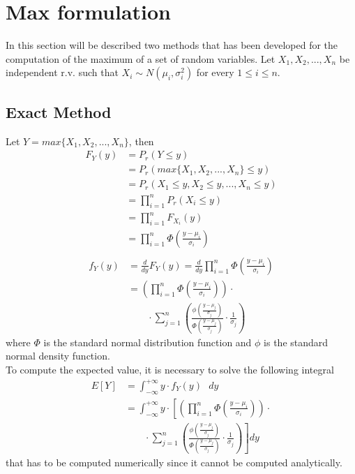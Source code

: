 \section{Max formulation}\label{max_formulation}

In this section will be described two methods that has been developed for the computation of the maximum of a set of random variables.
Let $X_1, X_2, ..., X_n$ be independent r.v. such that $X_i \sim N(\mu_i, \sigma_i^2)$ for every $1 \leq i \leq n.$

\subsection{Exact Method}
Let $Y = max\{X_1, X_2, ..., X_n\}$, then
\begin{align*}
	F_Y(y) &= P_r(Y \leq y) \\
	&= P_r(max\{X_1, X_2, ..., X_n\} \leq y) \\
	&= P_r(X_1 \leq y, X_2 \leq y, ..., X_n \leq y) \\
	&= \prod_{i = 1}^n P_r(X_i \leq y)  \tag*{(by indipendence of r.v)} \\
	&= \prod_{i = 1}^n F_{X_i}(y)  \\
	&= \prod_{i = 1}^n \Phi\left(\frac{y - \mu_i}{\sigma_i}\right) \\
\end{align*}
\begin{align*}
	f_Y(y) &= \frac{d}{dy} F_Y(y) = \frac{d}{dy} \prod_{i = 1}^n \Phi\left(\frac{y - \mu_i}{\sigma_i}\right) \\
	&= \left(\prod_{i = 1}^n \Phi\left(\frac{y - \mu_i}{\sigma_i}\right)\right) \cdot \\
	&\qquad \cdot \sum_{j = 1}^n \left(\frac{\phi\left(\frac{y - \mu_j}{\sigma_j}\right)}{\Phi\left(\frac{y - \mu_j}{\sigma_j}\right)} \cdot \frac{1}{\sigma_j}\right)
\end{align*}
where $\Phi$ is the standard normal distribution function and $\phi$ is the standard normal density function. \\
To compute the expected value, it is necessary to solve the following integral
\begin{align*}
	E[Y] &= \int_{-\infty}^{+\infty} y \cdot f_Y(y)\text{ }dy \\
	&= \int_{-\infty}^{+\infty} y \cdot \left[\left(\prod_{i = 1}^n \Phi\left(\frac{y - \mu_i}{\sigma_i}\right)\right) \cdot \right. \\
	&\left. \qquad \cdot \sum_{j = 1}^n \left(\frac{\phi\left(\frac{y - \mu_j}{\sigma_j}\right)}{\Phi\left(\frac{y - \mu_j}{\sigma_j}\right)} \cdot \frac{1}{\sigma_j}\right)\right]dy
\end{align*}
that has to be computed numerically since it cannot be computed analytically.

